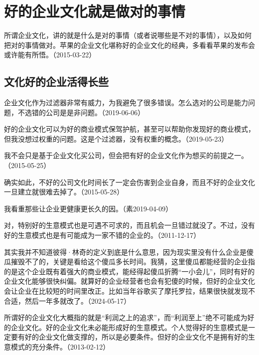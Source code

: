 
\section{好的企业文化就是做对的事情}

所谓企业文化，讲的就是什么是对的事情（或者说哪些是不对的事情），以及如何把对的事情做对。苹果的企业文化堪称好的企业文化的经典，多看看苹果的发布会或许能有所悟。（2015-03-22）

\subsection{文化好的企业活得长些}

企业文化作为过滤器非常有威力，为我避免了很多错误。怎么选对的公司是能力问题，不选错的公司是是非问题。（2019-06-06）

好的企业文化可以为好的商业模式保驾护航，甚至可以帮助你发现好的商业模式，但我没想过权重的问题。这是个过滤器，没有权重的概念。（2019-05-23）

我不会只是基于企业文化买公司，但会把有好的企业文化作为想买的前提之一。（2015-05-25）


确实如此，不好的公司文化时间长了一定会伤害到企业自身，而且不好的企业文化一旦建立就很难去掉了。（2015-05-28）


我看重那些让企业更健康更长久的因。（素2019-04-09）


对，特别好的生意模式也是可遇不可求的，而且机会一旦错过就没了。不过，没有好的生意模式也是有可能成为一家不错的企业的。（2011-12-17）


其实我并不知道彼得·林奇的定义到底是什么意思，因为现实里没有什么企业是傻瓜摧毁不了的，关键是看给这个傻瓜多长时间。我猜，这里傻瓜都能经营的企业指的是这个企业既有着强大的商业模式，能经得起傻瓜折腾“一小会儿”，同时有好的企业文化能够很快纠偏。就算好的企业经营者也会有犯傻的时候，但好的企业文化会让企业在比较短的时间里改正。比如当年谷歌买了摩托罗拉，结果很快就发现不合适，然后一年多就改了。（2024-05-17）

所谓好的企业文化大概指的就是“利润之上的追求”，而“利润至上”绝不可能成为好的企业文化。好的企业文化未必能形成好的生意模式。个人觉得好的生意模式是一定要有好的企业文化做支撑的，所以是必要条件。但好的企业文化不是拥有好的生意模式的充分条件。（2013-02-12）

